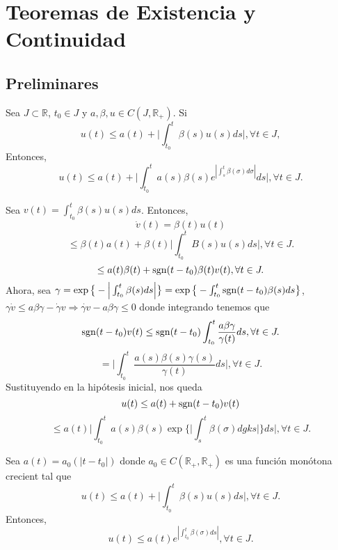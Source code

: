 \chapter{Teoremas de Existencia y Continuidad}

\section{Preliminares}

\begin{lem}
  Sea $J \subset \mathbb{R}$, $t_{0} \in J$ y $a,\beta,u \in C(J,\mathbb{R}_{+})$. Si 
  \[ 
    u(t) \leq a(t) + \Big | \int_{t_{0}}^{t} \beta(s) u(s) ds \Big |, \forall t \in J, 
  \] 
  Entonces,
  \[ 
     u(t) \leq a(t) + \Big | \int_{t_{0}}^{t} a(s) \beta(s) e^{| \int_{s}^{t} \beta(\sigma) d\sigma |} ds \Big |, \forall t \in J.
  \] 
\end{lem}

\begin{dem}
  Sea $v(t) = \int_{t_{0}}^{t} \beta(s) u(s) ds$. Entonces,
  \[ 
    \dot{v}(t) = \beta(t) u(t) 
  \] 
  \[ 
    \leq \beta(t) a(t) + \beta(t) \Big | \int_{t_{0}}^{t} B(s) u(s)  ds \Big |, \forall t \in J.
  \] 
  \[ 
    \leq a(t) \beta(t) + \operatorname{sgn}(t - t_{0}) \beta(t) v(t), \forall t \in J.
  \] 
  Ahora, sea $\gamma = \exp \big\{ - \Big | \int_{t_{0}}^{t} \beta(s) ds \Big | \big\} = \exp \big\{ - \int_{t_{0}}^{t} \operatorname{sgn} (t - t_{0}) \beta(s) ds \big\} $,
  $\gamma \dot{v} \leq a \beta \gamma - \dot{\gamma} v \Rightarrow \dot{\gamma v} - a \beta \gamma \leq 0$ donde integrando tenemos que
  \[ 
    \operatorname{sgn}(t-t_{0}) v(t) \leq \operatorname{sgn}(t -t_{0}) \int_{t_{0}}^{t} \frac{a \beta \gamma }{\gamma(t)} ds , \forall t \in J.
  \] 
  \[ 
    = \Big | \int_{t_{0}}^{t} \frac{a(s) \beta(s) \gamma(s)}{\gamma(t)} ds \Big |, \forall t \in J. 
  \] 
  Sustituyendo en la hipótesis inicial, nos queda
  \[ 
     u(t) \leq a(t) + \operatorname{sgn}(t -t_{0})v(t)
  \] 
  \[ 
    \leq a(t) \Big | \int_{t_{0}}^{t} a(s) \beta(s) \exp \Big\{ \Big | \int_{s}^{t} \beta(\sigma) dgks \Big | \Big\} ds \Big |, \forall t \in J.
  \] 
\end{dem}

\begin{cor}
  Sea $a(t) = a_{0}(| t -  t_{0} |)$ donde $a_{0} \in C(\mathbb{R}_{+}, \mathbb{R}_{+})$ es una función monótona crecient tal que
  \[ 
    u(t) \leq a(t) + \Big | \int_{t_{0}}^{t} \beta(s) u(s) ds \Big |, \forall t \in J. 
  \]
  Entonces, 
  \[ 
    u(t) \leq a(t) e^{| \int_{t_{0}}^{t} \beta(\sigma) ds |}, \forall t \in J. 
  \] 
\end{cor}

